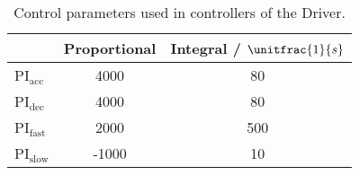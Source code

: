 \begin{table}[htbp]
	\centering
	\caption{Control parameters used in controllers of the Driver.}
	\label{tab:simParametersControllers}
	
	\begin{tabular}{l c c}
		\toprule
		& Proportional & Integral / $\unitfrac{1}{s}$ \\ 
		\midrule
		PI$_\mathrm{acc}$
		& 4000 & 80 \\
		\midrule
		PI$_\mathrm{dec}$
		& 4000 & 80 \\
		\midrule
		PI$_\mathrm{fast}$
		& 2000 & 500 \\
		\midrule
		PI$_\mathrm{slow}$
		& -1000 & 10 \\
		
		\bottomrule
	\end{tabular}
\end{table}

